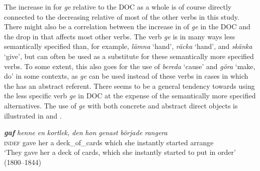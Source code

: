 \documentclass[output=paper]{langscibook}
\begin{document}
\begin{table}
\caption{\label{tab:valdeson:21}; Frequency measures of the verb-specific DOC with \textit{ge} ‘give’}
\end{table}

The increase in  for \textit{ge} relative to the DOC as a whole is of course directly connected to the decreasing relative  of most of the other verbs in this study. There might also be a correlation between the increase in  of \textit{ge} in the DOC and the drop in  that affects most other verbs. The verb \textit{ge} is in many ways less semantically specified than, for example, \textit{lämna} ‘hand’, \textit{räcka} ‘hand’, and \textit{skänka} ‘give’, but can often be used as a substitute for these semantically more specified verbs. To some extent, this also goes for the use of \textit{bereda} ‘cause’ and \textit{göra} ‘make, do’ in some contexts, as \textit{ge} can be used instead of these verbs in cases in which the  has an abstract referent. There seems to be a general tendency towards using the less specific verb \textit{ge} in DOC at the expense of the semantically more specified alternatives. The use of \textit{ge} with both concrete and abstract direct objects is illustrated in  and .\pagebreak


\ea \label{ex:valdeson:34}
\ea {} \textbf{\textit{gaf}} \textit{henne} \textit{en} \textit{kortlek,} \textit{den} \textit{hon} \textit{genast} \textit{började}   \textit{rangera}\\
 \textsc{indef}       gave     her     a   deck\_of\_cards    which    she instantly started           arrange\\ 
\glt ‘They gave her a deck of cards, which she instantly started to put in order’ (1800–1844)
\end{document}
